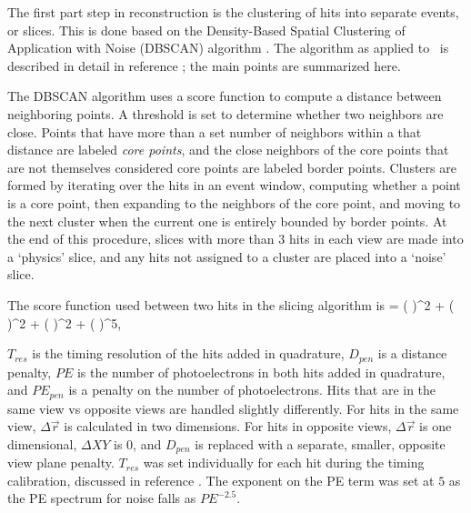 The first part step in reconstruction is the clustering of hits into separate events, or slices. This is done based on the Density-Based Spatial Clustering of Application with Noise (DBSCAN) algorithm \cite{ref:RecoDBSCAN}. The algorithm as applied to \nova~is described in detail in reference \cite{ref:ThesisMichael}; the main points are summarized here.

The DBSCAN algorithm uses a score function to compute a distance between neighboring points. A threshold is set to determine whether two neighbors are close. Points that have more than a set number of neighbors within a that distance are labeled {\em core points}, and the close neighbors of the core points that are not themselves considered core points are labeled {border points}. Clusters are formed by iterating over the hits in an event window, computing whether a point is a core point, then expanding to the neighbors of the core point, and moving to the next cluster when the current one is entirely bounded by border points. At the end of this procedure, slices with more than $3$ hits in each view are made into a `physics' slice, and any hits not assigned to a cluster are placed into a `noise' slice.

The score function used between two hits in the slicing algorithm is
\beq
\epsilon = \left(  \right)^2 + \left(  \right)^2 + \left(  \right)^2 + \left(  \right)^5,
\label{eq:SlicerScore}
\eeq

\n $T_{res}$ is the timing resolution of the hits added in quadrature, $D_{pen}$ is a distance penalty, $PE$ is the number of photoelectrons in both hits added in quadrature, and $PE_{pen}$ is a penalty on the number of photoelectrons. Hits that are in the same view vs opposite views are handled slightly differently. For hits in the same view, $\Delta \vec{r}$ is calculated in two dimensions. For hits in opposite views, $\Delta \vec{r}$ is one dimensional, $\Delta XY$ is 0, and $D_{pen}$ is replaced with a separate, smaller, opposite view plane penalty. $T_{res}$ was set individually for each hit during the timing calibration, discussed in reference \cite{ref:TNCalib}. The exponent on the PE term was set at $5$ as the PE spectrum for noise falls as $PE^{-2.5}$.

